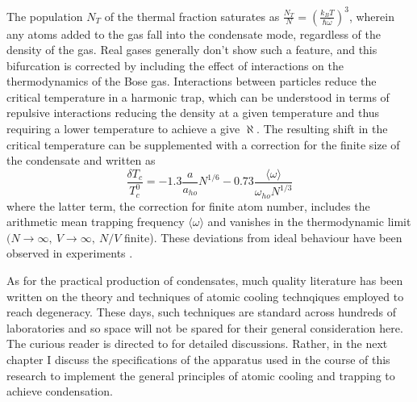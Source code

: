 	The population $N_T$ of the thermal fraction saturates as $\frac{N_T}{N} = \left(\frac{k_B T}{\hbar \bar{\omega}}\right)^3$, wherein any atoms added to the gas fall into the condensate mode, regardless of the density of the gas.
	Real gases generally don't show such a feature, and this bifurcation is corrected by including the effect of interactions on the thermodynamics of the Bose gas.	 
	Interactions between particles reduce the critical temperature in a harmonic trap, which can be understood in terms of repulsive interactions reducing the density at a given temperature and thus requiring a lower temperature to achieve a give $\aleph$.
	The resulting shift in the critical temperature can be supplemented with a correction for the finite size of the condensate and written as
	\begin{equation}
		\frac{\delta T_c}{T_c^{0}} = -1.3 \frac{a}{a_{ho}} N^{1/6} -0.73\frac{ \langle\omega\rangle}{\omega_{ho} N^{1/3}}
	\end{equation}
	where the latter term, the correction for finite atom number, includes the arithmetic mean trapping frequency $\langle\omega\rangle$ and vanishes in the thermodynamic limit $(N\rightarrow\infty,~V\rightarrow\infty,~N/V$ finite).
	These deviations from ideal behaviour have been observed in experiments \cite{Tammuz11,Smith11}.

	As for the practical production of condensates, much quality literature has been written on the theory and techniques of atomic cooling technqiques employed to reach degeneracy.
	These days, such techniques are standard across hundreds of laboratories and so space will not be spared for their general consideration here.
	The curious reader is directed to \cite{MakingProbingUnderstanding,Courteille01,MetVdS, TychkovThesis} for detailed discussions.
	Rather, in the next chapter I discuss the specifications of the apparatus used in the course of this research to implement the general principles of atomic cooling and trapping to achieve condensation.
	
	



